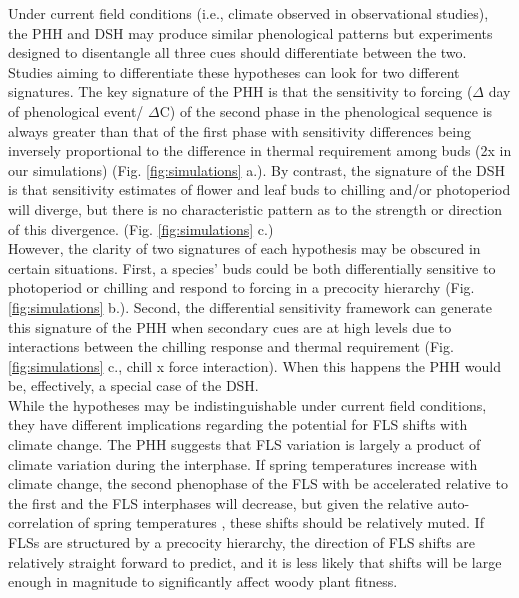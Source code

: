 \documentclass[11pt]{article}\usepackage[]{graphicx}\usepackage[]{color}
\begin{document}
\noindent Under current field conditions (i.e., climate observed in observational studies), the PHH and DSH may produce similar phenological patterns but experiments designed to disentangle all three cues should differentiate between the two. Studies aiming to differentiate these hypotheses can look for two different signatures. The key signature of the PHH is that the sensitivity to forcing ($\Delta$ day of phenological event/ $\Delta$\degree C) of the second phase in the phenological sequence is always greater than that of the first phase with sensitivity differences being inversely proportional to the difference in thermal requirement among buds (2x in our simulations) (Fig. \ref{fig:simulations} a.). By contrast, the signature of the DSH is that sensitivity estimates of flower and leaf buds to chilling and/or photoperiod will diverge, but there is no characteristic pattern as to the strength or direction of this divergence. (Fig. \ref{fig:simulations} c.)\\

\noindent However, the clarity of two signatures of each hypothesis may be obscured in certain situations. First, a species' buds could be both differentially sensitive to photoperiod or chilling and respond to forcing in a precocity hierarchy (Fig. \ref{fig:simulations} b.). Second, the differential sensitivity framework can generate this signature of the PHH when secondary cues are at high levels due to interactions between the chilling response and thermal requirement (Fig. \ref{fig:simulations} c., chill x force interaction). When this happens the PHH would be, effectively, a special case of the DSH.\\

\noident While the hypotheses may be indistinguishable under current field conditions, they have different implications regarding the potential for FLS shifts with climate change. The PHH suggests that FLS variation is largely a product of climate variation during the interphase. If spring temperatures increase with climate change, the second phenophase of the FLS with be accelerated relative to the first and the FLS interphases will decrease, but given the relative auto-correlation of spring temperatures \citep{Di-Cecco:2018aa}, these shifts should be relatively muted. If FLSs are structured by a precocity hierarchy, the direction of FLS shifts are relatively straight forward to predict, and it is less likely that shifts will be large enough in magnitude to significantly affect woody plant fitness.\\
\end{document}
